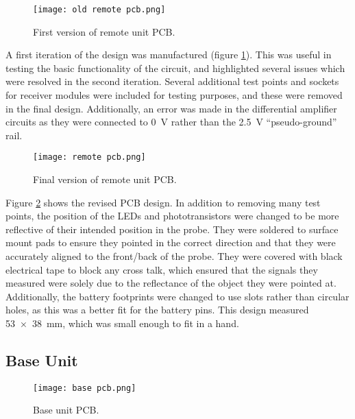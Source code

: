 \begin{figure}[htb]
	\centering
	\texttt{[image: old remote pcb.png]}
	\caption{First version of remote unit PCB.}
	\label{fig: old remote pcb}
\end{figure}

A first iteration of the design was manufactured (figure \ref{fig: old remote pcb}). This was useful in testing the basic functionality of the circuit, and highlighted several issues which were resolved in the second iteration. Several additional test points and sockets for receiver modules were included for testing purposes, and these were removed in the final design. Additionally, an error was made in the differential amplifier circuits as they were connected to \SI{0}{\volt} rather than the \SI{2.5}{\volt} ``pseudo-ground'' rail. \\



\begin{figure}[htb]
	\centering
	\texttt{[image: remote pcb.png]}
	\caption{Final version of remote unit PCB.}
	\label{fig: remote pcb}
\end{figure}

Figure \ref{fig: remote pcb} shows the revised PCB design. In addition to removing many test points, the position of the LEDs and phototransistors were changed to be more reflective of their intended position in the probe. They were soldered to surface mount pads to ensure they pointed in the correct direction and that they were accurately aligned to the front/back of the probe. They were covered with black electrical tape to block any cross talk, which ensured that the signals they measured were solely due to the reflectance of the object they were pointed at. Additionally, the battery footprints were changed to use slots rather than circular holes, as this was a better fit for the battery pins. This design measured \SI{53x38}{\milli\metre}, which was small enough to fit in a hand.






\subsection{Base Unit}

\begin{figure}[htb]
	\centering
	\texttt{[image: base pcb.png]}
	\caption{Base unit PCB.}
	\label{fig: base pcb}
\end{figure}

